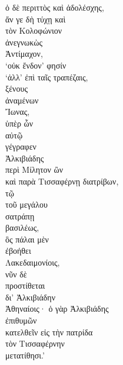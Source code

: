 {\large
\begin{greek}
\noindent ὁ δὲ περιττὸς καὶ ἀδολέσχης, \\
\tabto{2em} ἄν γε δὴ τύχῃ καὶ \\
\tabto{4em} τὸν Κολοφώνιον \\
\tabto{6em} ἀνεγνωκὼς \\
\tabto{4em} Ἀντίμαχον, \\
‘οὐκ ἔνδον’ φησίν \\
\tabto{2em} ‘ἀλλ' ἐπὶ ταῖς τραπέζαις, \\
\tabto{2em} ξένους \\
\tabto{4em} ἀναμένων \\
\tabto{2em}  Ἴωνας,\\
\tabto{4em} ὑπὲρ ὧν \\
\tabto{4em} αὐτῷ \\
\tabto{4em} γέγραφεν \\
\tabto{4em} Ἀλκιβιάδης \\
\tabto{6em} περὶ Μίλητον ὢν \\
\tabto{6em} καὶ παρὰ Τισσαφέρνῃ διατρίβων, \\
\tabto{8em} τῷ \\
\tabto{10em} τοῦ μεγάλου \\
\tabto{8em} σατράπῃ \\
\tabto{10em} βασιλέως, \\
\tabto{8em} ὃς πάλαι μὲν \\
\tabto{10em} ἐβοήθει \\
\tabto{10em} Λακεδαιμονίοις, \\
\tabto{8em} νῦν δὲ \\
\tabto{10em} προστίθεται \\
\tabto{12em} δι' Ἀλκιβιάδην \\
\tabto{10em} Ἀθηναίοις·
\tabto{12em} ὁ γὰρ Ἀλκιβιάδης \\
\tabto{12em} ἐπιθυμῶν \\
\tabto{14em} κατελθεῖν εἰς τὴν πατρίδα \\
\tabto{12em} τὸν Τισσαφέρνην \\
\tabto{12em} μετατίθησι.’\\

\end{greek}

}

